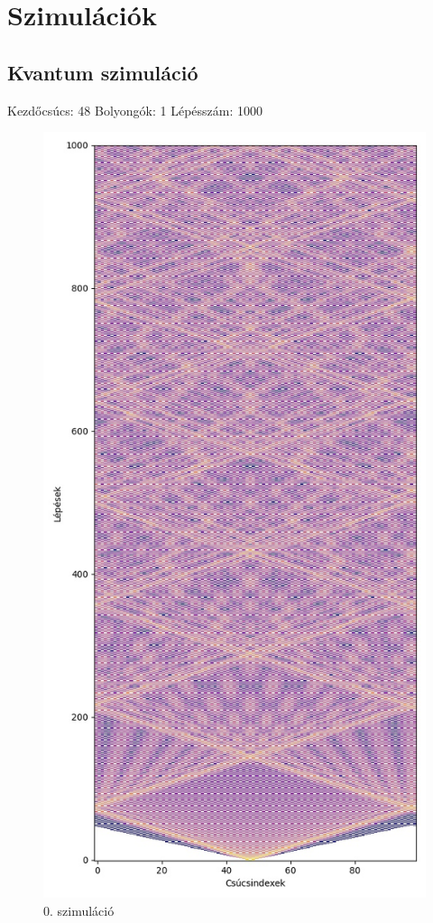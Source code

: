 \documentclass[14pt,a4paper]{article}
\begin{document}
\section{Szimulációk}
\subsection{Kvantum szimuláció}
Kezdőcsúcs: 48
Bolyongók: 1
Lépésszám: 1000
\begin{figure}[H]
\centering
\includegraphics[width = 0.7\columnwidth]{sim00.jpg}
\caption{0. szimuláció}
\end{figure}
\end{document}
